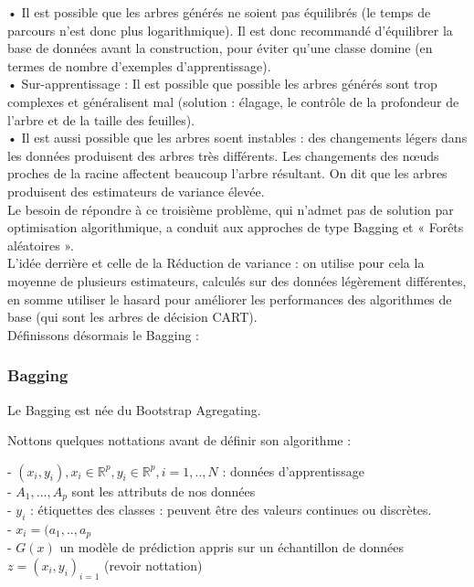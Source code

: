 \documentclass[11pt]{article}
\begin{document}
•	Il est possible que les arbres générés ne soient pas équilibrés (le temps de parcours n’est donc plus logarithmique). Il est donc recommandé d’équilibrer la base de données avant la construction, pour éviter qu’une classe domine (en termes de nombre d’exemples d’apprentissage).\\
•	Sur-apprentissage : Il est possible que possible les arbres générés sont trop complexes et généralisent mal (solution : élagage, le contrôle de la profondeur de l’arbre et de la taille des feuilles).\\
•	Il est aussi possible que les arbres soent instables : des changements légers dans les données produisent des arbres très différents. Les changements des nœuds proches de la racine affectent beaucoup l’arbre résultant. On dit que les arbres produisent des estimateurs de variance élevée.\\

Le besoin de répondre à ce troisième problème, qui n’admet pas de solution par optimisation algorithmique, a conduit aux approches de type Bagging et « Forêts aléatoires ».\\

L’idée derrière et celle de la Réduction de variance : on utilise pour cela la moyenne de plusieurs estimateurs, calculés sur des données légèrement différentes, en somme utiliser le hasard pour améliorer les performances des algorithmes de base (qui sont les arbres de décision CART).\\

Définissons désormais le Bagging : 

\subsubsection{Bagging} 

Le Bagging est née du Bootstrap Agregating.

Nottons quelques nottations avant de définir son algorithme :

- $(x_{i},y_{i}),x_{i} \in \mathbb{R}^p, y_{i} \in \mathbb{R}^p, i=1,..,N$ : données d'apprentissage \\
- $A_{1},...,A_{p}$ sont les attributs de nos données\\
- $y_{i}$ : étiquettes des classes : peuvent être des valeurs continues ou discrètes.\\
- $x_{i}=(a_{1},..,a_{p}$\\
- $G(x)$ un modèle de prédiction appris sur un échantillon de données $z ={(x_{i},y_{i})_{i=1}}$ (revoir nottation)\\
\end{document}
